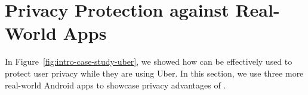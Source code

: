 \section{Privacy Protection against Real-World Apps}
\label{sec:protecting_up}






In Figure~\ref{fig:intro-case-study-uber}, we showed how \framework can be
effectively used to protect user privacy while they are using Uber.  In this
section, we use three more real-world Android apps to showcase privacy
advantages of \framework.

